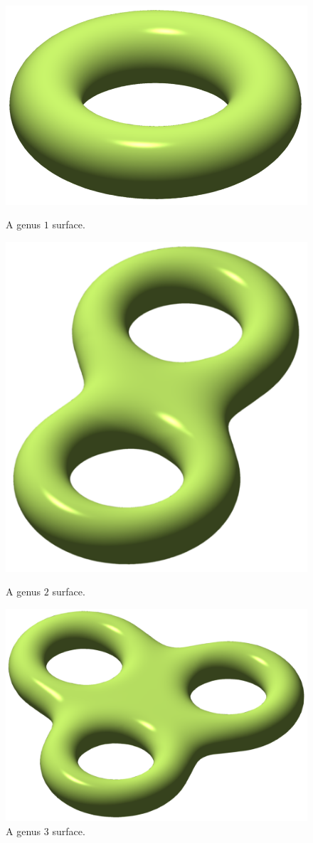 \begin{figure}
\centering
\begin{minipage}{.33\textwidth}
  \centering
  \includegraphics[width=.8\linewidth]{images/genus-1-surface}
  \caption{A genus $1$ surface.}
  \label{genus-1-surface}
\end{minipage}%
\begin{minipage}{.33\textwidth}
  \centering
  \includegraphics[width=.8\linewidth]{images/genus-2-surface}
  \caption{A genus $2$ surface.}
  \label{genus-2-surface}
\end{minipage}%
\begin{minipage}{.33\textwidth}
  \centering
  \includegraphics[width=.8\linewidth]{images/genus-3-surface}
  \caption{A genus $3$ surface.}
  \label{genus-3-surface}
\end{minipage}%
\end{figure}
